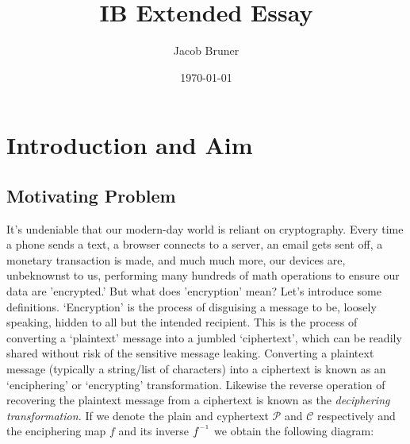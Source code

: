 \documentclass[11pt,a4paper]{article}
\author{Jacob Bruner}
\title{IB Extended Essay}
\date{\today}
\newcommand{\inv}{^{\raisebox{.2em}{$\scriptscriptstyle-1$}}}
\begin{document}
\maketitle
\tableofcontents

\pagebreak

\section{Introduction and Aim}
\subsection{Motivating Problem}
It's undeniable that our modern-day world is reliant on cryptography. Every time a phone sends a text, a browser connects to a server, an email gets sent off, a monetary transaction is made, and much much more, our devices are, unbeknownst to us, performing many hundreds of math operations to ensure our data are 'encrypted.' 
But what does 'encryption' mean? Let's introduce some definitions. ‘Encryption’ is the process of disguising a message to be, loosely speaking, hidden to all but the intended recipient. This is the process of converting a ‘plaintext’ message into a jumbled ‘ciphertext’, which can be readily shared without risk of the sensitive message leaking. Converting a plaintext message (typically a string/list of characters) into a ciphertext is known as an ‘enciphering’ or ‘encrypting’ transformation. Likewise the reverse operation of recovering the plaintext message from a ciphertext is known as the \textit{deciphering transformation.}\autocite[54]{koblitz} If we denote the plain and cyphertext $\mathcal{P}$ and $\mathcal{C}$ respectively and the enciphering map $f$ and its inverse $f\inv$ we obtain the following diagram:
\end{document}
